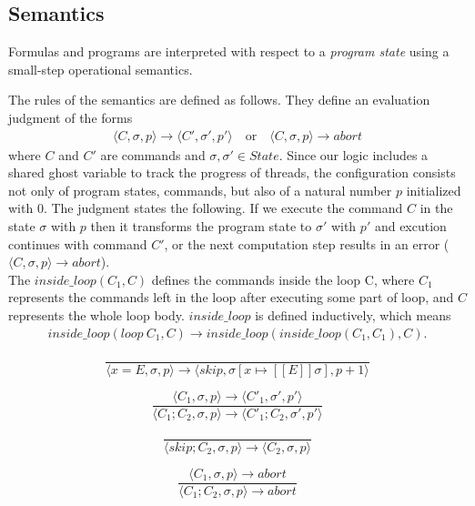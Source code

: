 \documentclass{article}
\begin{document}
\subsection{Semantics}
Formulas and programs are interpreted with respect to a \textit{program state} using a small-step operational semantics.

The rules of the semantics are defined as follows. They define an evaluation judgment of the forms
\begin{align*}
\langle C, \sigma, p \rangle \to \langle C', \sigma', p' \rangle \quad \mathrm{or} \quad \langle C, \sigma, p \rangle \to abort
\end{align*}
where $C$ and $C'$ are commands and $\sigma, \sigma'\in State$. Since our logic includes a shared ghost variable to track the progress of threads, the configuration consists not only of program states, commands, but also of a natural number $p$ initialized with $0$. The judgment states the following. If we execute the command $C$ in the state $\sigma$ with $p$ then it transforms the program state to $\sigma'$ with $p'$ and excution continues with command $C'$, or the next computation step results in an error ($\langle C, \sigma, p \rangle \to abort$). \\

The $inside\_loop(C_1, C)$ defines the commands inside the loop C, where $C_1$ represents the commands left in the loop after executing some part of loop, and $C$ represents the whole loop body. $inside\_loop$ is defined inductively, which means 
\begin{align*}
inside\_loop(loop\ C_1, C) \rightarrow inside\_loop(inside\_loop(C_1, C_1), C).
\end{align*}

\ottfundefnaborts


\ottdefnstep

\[
\tag{\sc Assign}
\frac{}
{\langle {x = E}, \sigma, p \rangle \to \langle skip, \sigma[x \mapsto [\![E]\!]\sigma], p + 1 \rangle}
\]

\[
\tag{\sc Seq1}
\frac{\langle C_1, \sigma, p \rangle \to \langle C'_1, \sigma', p' \rangle}
{\langle C_1; C_2, \sigma, p \rangle \to \langle C'_1; C_2, \sigma', p' \rangle}
\]

\[
\tag{\sc Seq2}
\frac{}
{\langle skip; C_2, \sigma, p \rangle \to \langle C_2, \sigma, p \rangle}
\]

\[
\tag{\sc SeqAbort}
\frac{\langle C_1, \sigma, p \rangle \to abort}
{\langle C_1; C_2, \sigma, p \rangle \to abort}
\]
\end{document}
